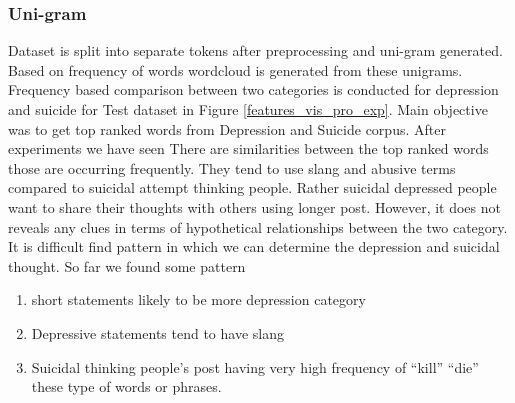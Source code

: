 \documentclass[sn-mathphys,Numbered]{sn-jnl}%
\theoremstyle{thmstyleone}%
\theoremstyle{thmstyletwo}%
\theoremstyle{thmstylethree}%
\begin{document}
\subsubsection{Uni-gram}
Dataset is split into separate tokens after preprocessing and uni-gram generated. Based on frequency of words wordcloud is generated from these unigrams. Frequency based comparison between two categories is conducted for depression and suicide for Test dataset in Figure \ref{features_vis_pro_exp}. Main objective was to get top ranked words from Depression and Suicide corpus. After experiments we have seen There are similarities between the top ranked words those are occurring frequently. They tend to use slang and abusive terms compared to suicidal attempt thinking people. Rather suicidal depressed people want to share their thoughts with others using longer post. However, it does not reveals any clues in terms of hypothetical relationships between the two category. It is difficult find pattern in which we can determine the depression and suicidal thought. So far we found some pattern 
\begin{enumerate}
\item short statements likely to be more depression category
\item Depressive statements tend to have slang
\item Suicidal thinking people’s post having very high frequency of “kill” “die” these type of words or phrases.
\end{enumerate}
\end{document}
